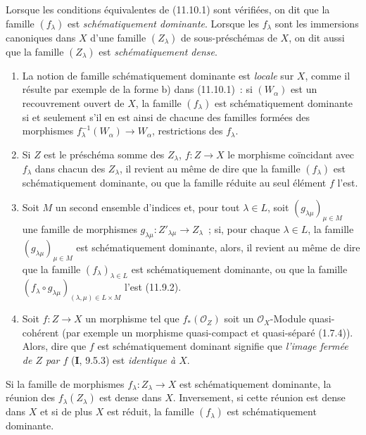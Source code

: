 \begin{definition}[11.10.2]
\label{IV.11.10.2-fr}
Lorsque les conditions équivalentes de (11.10.1) sont vérifiées, on dit que la
famille $(f_\lambda)$ est \emph{schématiquement dominante}. Lorsque les
$f_\lambda$ sont les immersions canoniques dans $X$ d'une famille
$(Z_\lambda)$ de sous-préschémas de $X$, on dit aussi que la famille
$(Z_\lambda)$ est \emph{schématiquement dense}.
\end{definition}

\begin{remarks}[11.10.3]
\label{IV.11.10.3-fr}
\begin{enumerate}[label=(\roman*)]
  \item La notion de famille schématiquement dominante est \emph{locale} sur
  $X$, comme il résulte par exemple de la forme b) dans (11.10.1)~: si
  $(W_\alpha)$ est un recouvrement ouvert de $X$, la famille $(f_\lambda)$ est
  schématiquement dominante si et seulement s'il en est ainsi de chacune des
  familles formées des morphismes
  $f_\lambda^{-1}(W_\alpha)\to W_\alpha$, restrictions des $f_\lambda$.
  \item Si $Z$ est le préschéma somme des $Z_\lambda$, $f:Z\to X$ le morphisme
  coïncidant avec $f_\lambda$ dans chacun des $Z_\lambda$, il revient au même
  de dire que la famille $(f_\lambda)$ est schématiquement dominante, ou que
  la famille réduite au seul élément $f$ l'est.
  \item Soit $M$ un second ensemble d'indices et, pour tout $\lambda\in L$,
  soit $(g_{\lambda\mu})_{\mu\in M}$ une famille de morphismes
  $g_{\lambda\mu}:Z'_{\lambda\mu}\to Z_\lambda$~; si, pour chaque
  $\lambda\in L$, la famille $(g_{\lambda\mu})_{\mu\in M}$ est
  schématiquement dominante, alors, il revient au même de dire que la famille
  $(f_\lambda)_{\lambda\in L}$ est schématiquement dominante, ou que la
  famille
  $(f_\lambda\circ g_{\lambda\mu})_{(\lambda,\mu)\in L\times M}$ l'est
  (11.9.2).
  \item Soit $f:Z\to X$ un morphisme tel que $f_*(\mathcal O_Z)$ soit un
  $\mathcal O_X$-Module quasi-cohérent (par exemple un morphisme quasi-compact
  et quasi-séparé (1.7.4)). Alors, dire que $f$ est schématiquement dominant
  signifie que \emph{l'image fermée de $Z$ par $f$} ($\mathbf I$, 9.5.3) est
  \emph{identique à $X$}.
\end{enumerate}
\end{remarks}

\begin{proposition}[11.10.4]
\label{IV.11.10.4-fr}
Si la famille de morphismes $f_\lambda:Z_\lambda\to X$ est schématiquement
dominante, la réunion des $f_\lambda(Z_\lambda)$ est dense dans $X$.
Inversement, si cette réunion est dense dans $X$ et si de plus $X$ est réduit,
la famille $(f_\lambda)$ est schématiquement dominante.
\end{proposition}

